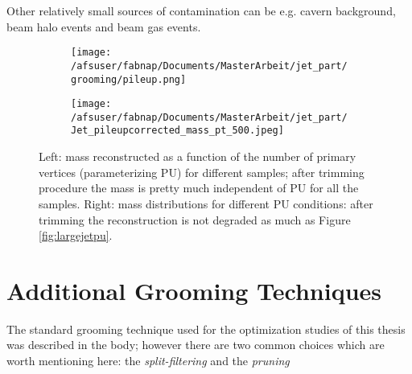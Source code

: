 Other relatively small sources of contamination can be e.g. cavern background, beam halo events and beam gas events.


\begin{figure}
    \centering
    \begin{subfigure}[b]{0.45\textwidth}
	\centering
        \texttt{[image: /afsuser/fabnap/Documents/MasterArbeit/jet\_part/grooming/pileup.png]}
 
    \end{subfigure}
    \begin{subfigure}[b]{0.45\textwidth}
	\centering
        \texttt{[image: /afsuser/fabnap/Documents/MasterArbeit/jet\_part/Jet\_pileupcorrected\_mass\_pt\_500.jpeg]}
   
    \end{subfigure}
    \caption[Effect of pile-up before and after trimming]{Left: mass reconstructed as a function of the number of primary vertices (parameterizing PU) for different samples; after trimming procedure the mass is pretty much independent of PU for all the samples. Right: mass distributions for different PU conditions: after trimming the reconstruction is not degraded as much as Figure \ref{fig:largejetpu}.} 
    \label{fig:trimmingperformance}
\end{figure}

\section{Additional Grooming Techniques}
The standard grooming technique used for the optimization studies of this thesis was described in the body; however there are two common choices which are worth mentioning here: the \textit{split-filtering} and the \textit{pruning}

